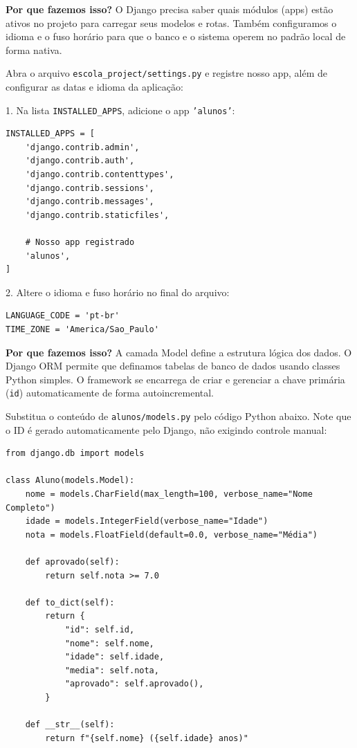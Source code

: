 \documentclass[12pt,a4paper]{article}
\begin{document}
\begin{boxAtividade}
\textbf{Por que fazemos isso?} O Django precisa saber quais módulos (apps) estão ativos no projeto para carregar seus modelos e rotas. Também configuramos o idioma e o fuso horário para que o banco e o sistema operem no padrão local de forma nativa.

Abra o arquivo \texttt{escola\_project/settings.py} e registre nosso app, além de configurar as datas e idioma da aplicação:

1. Na lista \texttt{INSTALLED\_APPS}, adicione o app \texttt{'alunos'}:
\begin{boxCodigo}
\begin{verbatim}
INSTALLED_APPS = [
    'django.contrib.admin',
    'django.contrib.auth',
    'django.contrib.contenttypes',
    'django.contrib.sessions',
    'django.contrib.messages',
    'django.contrib.staticfiles',
    
    # Nosso app registrado
    'alunos',
]
\end{verbatim}
\end{boxCodigo}

2. Altere o idioma e fuso horário no final do arquivo:
\begin{boxCodigo}
\begin{verbatim}
LANGUAGE_CODE = 'pt-br'
TIME_ZONE = 'America/Sao_Paulo'
\end{verbatim}
\end{boxCodigo}
\end{boxAtividade}


\begin{boxAtividade}
\textbf{Por que fazemos isso?} A camada Model define a estrutura lógica dos dados. O Django ORM permite que definamos tabelas de banco de dados usando classes Python simples. O framework se encarrega de criar e gerenciar a chave primária (\texttt{id}) automaticamente de forma autoincremental.

Substitua o conteúdo de \texttt{alunos/models.py} pelo código Python abaixo. Note que o ID é gerado automaticamente pelo Django, não exigindo controle manual:
\begin{boxCodigo}
\begin{verbatim}
from django.db import models

class Aluno(models.Model):
    nome = models.CharField(max_length=100, verbose_name="Nome Completo")
    idade = models.IntegerField(verbose_name="Idade")
    nota = models.FloatField(default=0.0, verbose_name="Média")

    def aprovado(self):
        return self.nota >= 7.0

    def to_dict(self):
        return {
            "id": self.id,
            "nome": self.nome,
            "idade": self.idade,
            "media": self.nota,
            "aprovado": self.aprovado(),
        }

    def __str__(self):
        return f"{self.nome} ({self.idade} anos)"
\end{verbatim}
\end{boxCodigo}
\end{boxAtividade}
\end{document}
